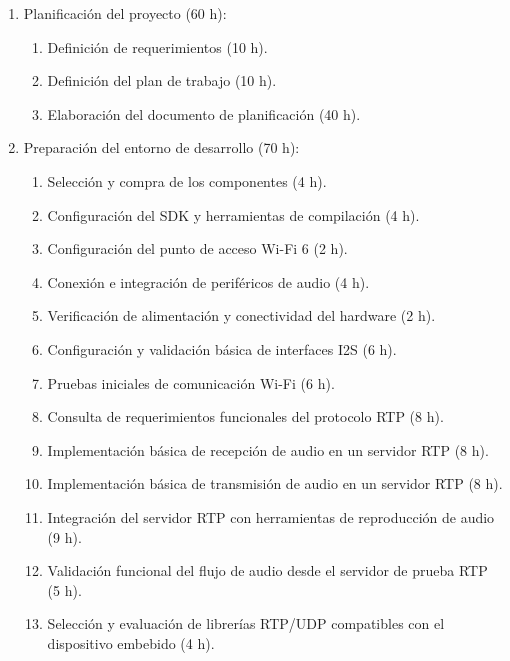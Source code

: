 \documentclass[
11pt, %
]{charter}
\begin{document}
\begin{enumerate}
	\item Planificación del proyecto (60 h):
		\begin{enumerate}
			\item Definición de requerimientos (10 h).
			\item Definición del plan de trabajo (10 h).
			\item Elaboración del documento de planificación (40 h).
		\end{enumerate}

	\item Preparación del entorno de desarrollo (70 h):
		\begin{enumerate}
			\item Selección y compra de los componentes (4 h).
			\item Configuración del SDK y herramientas de compilación (4 h).
			\item Configuración del punto de acceso Wi-Fi 6 (2 h).
			\item Conexión e integración de periféricos de audio (4 h).
			\item Verificación de alimentación y conectividad del hardware (2 h).
			\item Configuración y validación básica de interfaces I2S (6 h).
			\item Pruebas iniciales de comunicación Wi-Fi (6 h).
			\item Consulta de requerimientos funcionales del protocolo RTP (8 h).
			\item Implementación básica de recepción de audio en un servidor RTP (8 h).
			\item Implementación básica de transmisión de audio en un servidor RTP  (8 h).
			\item Integración del servidor RTP con herramientas de reproducción de audio (9 h).
			\item Validación funcional del flujo de audio desde el servidor de prueba RTP  (5 h).
			\item Selección y evaluación de librerías RTP/UDP compatibles con el dispositivo embebido (4 h).
		\end{enumerate}	
	

\end{enumerate}
\end{document}
